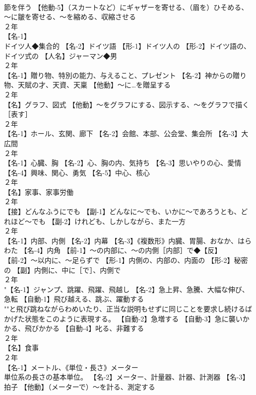 \documentclass[8pt]{extreport}
\begin{document}
\begin{CJK}{UTF8}{min}
\\	節を伴う 【他動-5】（スカートなど）にギャザーを寄せる、（眉を）ひそめる、～に皺を寄せる、～を縮める、収縮させる
\\	２年	
\\	【名-1】
\\	ドイツ人◆集合的 【名-2】ドイツ語 【形-1】ドイツ人の 【形-2】ドイツ語の、ドイツ式の 【人名】ジャーマン◆男
\\	２年	
\\	【名-1】贈り物、特別の能力、与えること、プレゼント 【名-2】神からの贈り物、天賦の才、天資、天稟 【他動】～に…を贈呈する
\\	２年	
\\	【名】グラフ、図式 【他動】～をグラフにする、図示する、～をグラフで描く［表す］
\\	２年	
\\	【名-1】ホール、玄関、廊下 【名-2】会館、本部、公会堂、集会所 【名-3】大広間
\\	２年	
\\	【名-1】心臓、胸 【名-2】心、胸の内、気持ち 【名-3】思いやりの心、愛情 【名-4】興味、関心、勇気 【名-5】中心、核心
\\	２年	
\\	【名】家事、家事労働
\\	２年	
\\	【接】どんなふうにでも 【副-1】どんなに～でも、いかに～であろうとも、どれほど～でも 【副-2】けれども、しかしながら、また一方
\\	２年	
\\	【名-1】内部、内側 【名-2】内幕 【名-3】《複数形》内臓、胃腸、おなか、はらわた 【名-4】内角 【前-1】～の内部に、～の内側［内部］で◆【反】
\\	【前-2】～以内に、～足らずで 【形-1】内側の、内部の、内面の 【形-2】秘密の 【副】内側に、中に［で］、内側で
\\	２年	
\\	"【名-1】ジャンプ、跳躍、飛躍、飛越し 【名-2】急上昇、急騰、大幅な伸び、急転 【自動-1】飛び越える、跳ぶ、躍動する 
\\	""と飛び跳ねながらわめいたり、正当な説明もせずに同じことを要求し続けるばかげた状態をこのように表現する。 【自動-2】急増する 【自動-3】急に襲いかかる、飛びかかる 【自動-4】叱る、非難する
\\	２年	
\\	【名】食事
\\	２年	
\\	【名-1】メートル、《単位・長さ》メーター
\\	単位系の長さの基本単位。 【名-2】メーター、計量器、計器、計測器 【名-3】拍子 【他動】（メーターで）～を計る、測定する

\end{CJK}
\end{document}
